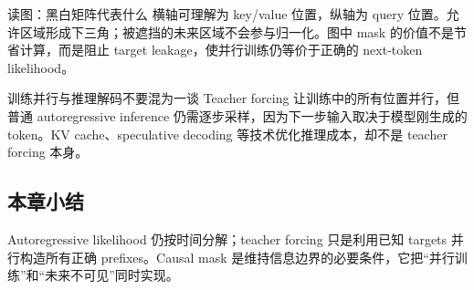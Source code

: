 
\begin{knowledgebox}{读图：黑白矩阵代表什么}
横轴可理解为 key/value 位置，纵轴为 query 位置。允许区域形成下三角；被遮挡的未来区域不会参与归一化。图中 mask 的价值不是节省计算，而是阻止 target leakage，使并行训练仍等价于正确的 next-token likelihood。
\end{knowledgebox}

\begin{warningbox}{训练并行与推理解码不要混为一谈}
Teacher forcing 让训练中的所有位置并行，但普通 autoregressive inference 仍需逐步采样，因为下一步输入取决于模型刚生成的 token。KV cache、speculative decoding 等技术优化推理成本，却不是 teacher forcing 本身。
\end{warningbox}


\subsection{本章小结}

Autoregressive likelihood 仍按时间分解；teacher forcing 只是利用已知 targets 并行构造所有正确 prefixes。Causal mask 是维持信息边界的必要条件，它把“并行训练”和“未来不可见”同时实现。

